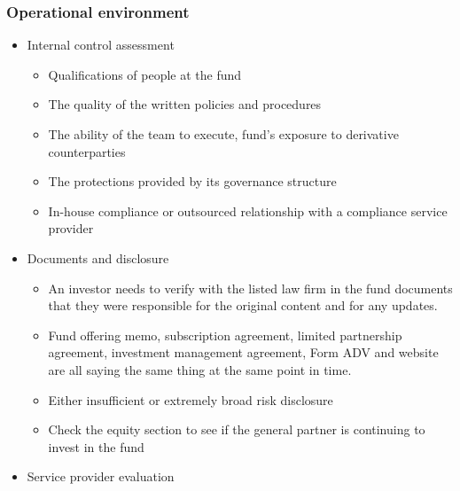 \subsubsection{Operational environment}
\begin{itemize}
\item Internal control assessment
    \begin{itemize}
    \item Qualifications of people at the fund
    \item The quality of the written policies and procedures
    \item The ability of the team to execute, fund's exposure to derivative counterparties
    \item The protections provided by its governance structure
    \item In-house compliance or outsourced relationship with a compliance service provider
    \end{itemize}
\item Documents and disclosure
    \begin{itemize}
    \item An investor needs to verify with the listed law firm in the fund documents that they were responsible for the original content and for any updates.
    \item Fund offering memo, subscription agreement, limited partnership agreement, investment management agreement, Form ADV and website are all saying the same thing at the same point in time.
    \item Either insufficient or extremely broad risk disclosure
    \item Check the equity section to see if the general partner is continuing to invest in the fund
    \end{itemize}
\item Service provider evaluation

\end{itemize}



